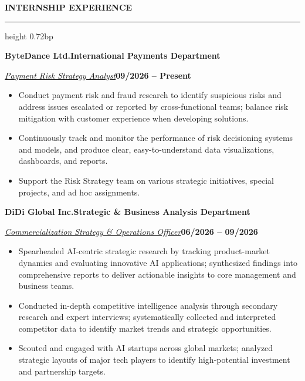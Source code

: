 \documentclass[10pt,a4paper]{article}
\newcommand{\sectionrule}[1]{%
  \par\vspace{1.80bp}\noindent\textbf{#1}\par\vspace{2.62bp}%
  \hrule height 0.72bp\vspace{1.80bp}%
}
\newcommand{\entrycompany}[2]{%
  \par\vspace{0.80bp}\noindent\textbf{#1}\hfill\textbf{#2}\par\vspace{0.50bp}%
}
\let\jobcompany\entrycompany
\newcommand{\metaline}[2]{%
  \par\noindent\uline{\textit{#1}}\hfill\textbf{#2}\par\vspace{0.50bp}%
}
\let\roleline\metaline
\newenvironment{cvitems}{%
  \begin{itemize}[leftmargin=14.20bp,labelwidth=4.20bp,labelsep=10.00bp,align=left,
    topsep=0bp,itemsep=0bp,parsep=0bp,partopsep=0bp,label={\textbullet}]
}{\end{itemize}}
\begin{document}
\sectionrule{INTERNSHIP EXPERIENCE}
\jobcompany{ByteDance Ltd.}{International Payments Department}
\roleline{Payment Risk Strategy Analyst}{09/2026 -- Present}
\begin{cvitems}
\item Conduct payment risk and fraud research to identify suspicious risks and address issues escalated or reported by cross-functional teams; balance risk mitigation with customer experience when developing solutions.
\item Continuously track and monitor the performance of risk decisioning systems and models, and produce clear, easy-to-understand data visualizations, dashboards, and reports.
\item Support the Risk Strategy team on various strategic initiatives, special projects, and ad hoc assignments.
\end{cvitems}

\jobcompany{DiDi Global Inc.}{Strategic \& Business Analysis Department}
\roleline{Commercialization Strategy \& Operations Officer}{06/2026 -- 09/2026}
\begin{cvitems}
\item Spearheaded AI-centric strategic research by tracking product-market dynamics and evaluating innovative AI applications; synthesized findings into comprehensive reports to deliver actionable insights to core management and business teams.
\item Conducted in-depth competitive intelligence analysis through secondary research and expert interviews; systematically collected and interpreted competitor data to identify market trends and strategic opportunities.
\item Scouted and engaged with AI startups across global markets; analyzed strategic layouts of major tech players to identify high-potential investment and partnership targets.
\end{cvitems}
\end{document}
